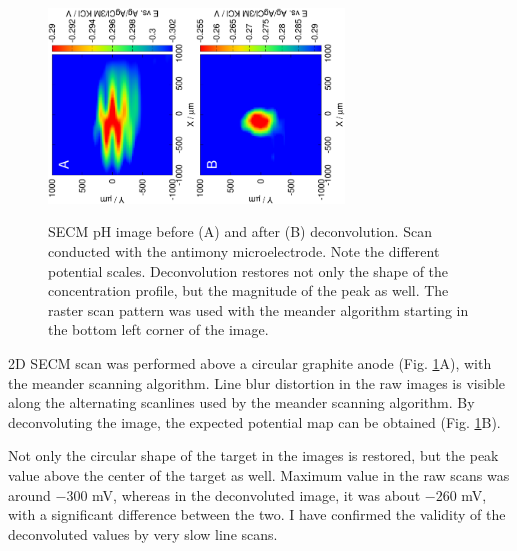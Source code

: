 \begin{figure}
\centering
\includegraphics[trim = 10mm 30mm 0mm 10mm, clip, width=0.35\textwidth, angle=-90]{img/pH_2D_Sb/13121313.eps}\includegraphics[trim = 10mm 30mm 0mm 10mm, clip, width=0.35\textwidth, angle=-90]{img/pH_2D_Sb/13121313_deconvoluted.eps}%
\caption{SECM pH image before (A) and after (B) deconvolution.
Scan conducted with the antimony microelectrode.
Note the different potential scales.
Deconvolution restores not only the shape of the concentration profile, but the magnitude of the peak as well.
The raster scan pattern was used with the meander algorithm starting in the bottom left corner of the image.}
\label{fig:deconvolution}
\end{figure}

2D SECM scan was performed above a circular graphite anode (Fig. \ref{fig:deconvolution}A), with the meander scanning algorithm.
Line blur distortion in the raw images is visible along the alternating scanlines used by the meander scanning algorithm.
By deconvoluting the image, the expected potential map can be obtained (Fig. \ref{fig:deconvolution}B). 

Not only the circular shape of the target in the images is restored, but the peak value above the center of the target as well.
Maximum value in the raw scans was around $-300$ mV, whereas in the deconvoluted image, it was about $-260$ mV, with a significant difference between the two.
I have confirmed the validity of the deconvoluted values by very slow line scans. 

